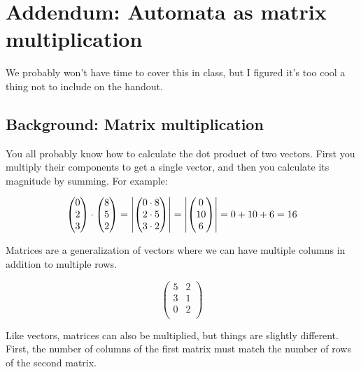 \appendix
\section*{Addendum: Automata as matrix multiplication}%
\label{sec:matrix}

We probably won't have time to cover this in class, but I figured it's too cool a thing not to include on the handout.

\subsection*{Background: Matrix multiplication}
\label{sub:matrix_multiplication}

You all probably know how to calculate the dot product of two vectors.
First you multiply their components to get a single vector, and then you calculate its magnitude by summing.
For example:

\[
      \begin{pmatrix}0\\ 2\\ 3\end{pmatrix} \cdot \begin{pmatrix}8\\5\\2\end{pmatrix}
    = \left | \begin{pmatrix}0 \cdot 8\\ 2 \cdot 5\\ 3 \cdot 2\end{pmatrix} \right |
    = \left | \begin{pmatrix}0\\10\\6\end{pmatrix} \right |
    = 0 + 10 + 6\\
    = 16
\]

Matrices are a generalization of vectors where we can have multiple columns in addition to multiple rows.

\[
    \begin{pmatrix}
        5 & 2\\
        3 & 1\\
        0 & 2\\
    \end{pmatrix}
\]

Like vectors, matrices can also be multiplied, but things are slightly different.
First, the number of columns of the first matrix must match the number of rows of the second matrix.

